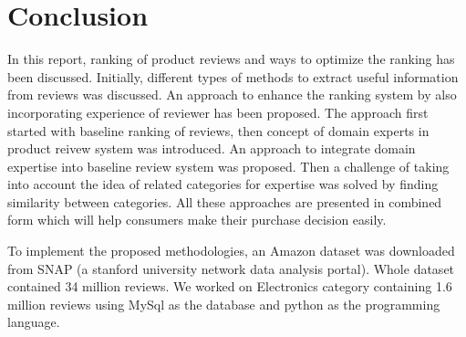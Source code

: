 \section{Conclusion}\label{sec:conclusion}

In this report, ranking of product reviews and ways to optimize the ranking 
has been discussed. Initially, different types of methods to extract useful 
information from reviews was discussed. An approach to enhance the ranking 
system by also incorporating experience of reviewer has been proposed. The 
approach first started with baseline ranking of reviews, then concept of 
domain experts in product reivew system was introduced. An approach to 
integrate domain expertise into baseline review system was proposed. 
Then a challenge of taking into account the idea of related categories 
for expertise was solved by finding similarity between categories. 
All these approaches are presented in combined form which will help 
consumers make their purchase decision easily.

To implement the proposed methodologies, an Amazon dataset was 
downloaded from SNAP (a stanford university network data analysis portal). 
Whole dataset contained 34 million reviews. We worked on Electronics 
category containing 1.6 million reviews using MySql as the database 
and python as the programming language. 

